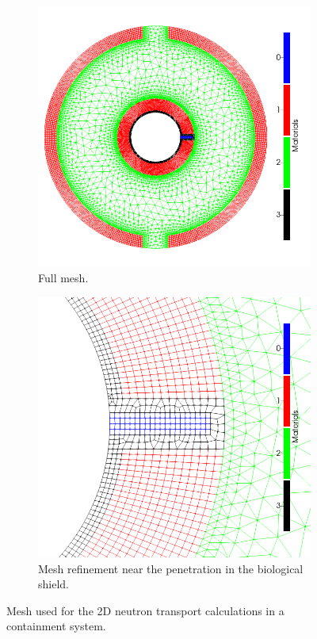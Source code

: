 \begin{figure}[H]
    \centering
    \begin{subfigure}[b]{0.495\textwidth}
        \centering
        \includegraphics[width=\textwidth]{images/demos/bwr_shield/neu_mesh.png}
        \caption{Full mesh.}
        \label{fig:demo:bwr:mesh:neu_full}
    \end{subfigure}
    \hfill
    \begin{subfigure}[b]{0.495\textwidth}
        \centering
        \includegraphics[width=\textwidth]{images/demos/bwr_shield/neu_mesh_close.png}
        \caption{Mesh refinement near the penetration in the biological shield.}
        \label{fig:demo:bwr:mesh:neu_streaming}
    \end{subfigure}
    \caption{Mesh used for the 2D neutron transport calculations in a containment system.}
    \label{fig:demo:bwr:neu_mesh}
\end{figure}

